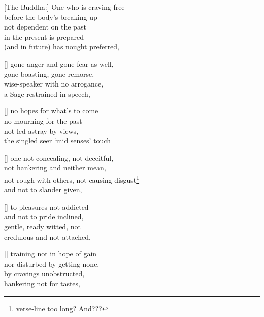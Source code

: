 \begin{MyDescription}{}[The Buddha:]
One who is craving-free\\
before the body's breaking-up\\
not dependent on the past\\
in the present is prepared\\
(and in future) has nought preferred,
\end{MyDescription}

\begin{MyDescription}{}[]
gone anger and gone fear as well,\\
gone boasting, gone remorse,\\
wise-speaker with no arrogance,\\
a Sage restrained in speech,
\end{MyDescription}

\begin{MyDescription}{}[]
no hopes for what's to come\\
no mourning for the past\\
not led astray by views,\\
the singled seer `mid senses' touch
\end{MyDescription}

\begin{MyDescription}{}[]
one not concealing, not deceitful,\\
not hankering and neither mean,\\
not rough with others, not causing disgust\footnote{verse-line too long? And???}\\
and not to slander given,
\end{MyDescription}

\begin{MyDescription}{}[]
to pleasures not addicted\\
and not to pride inclined,\\
gentle, ready witted, not\\
credulous and not attached,
\end{MyDescription}

\begin{MyDescription}{}[]
training not in hope of gain\\
nor disturbed by getting none,\\
by cravings unobstructed,\\
hankering not for tastes,
\end{MyDescription}

